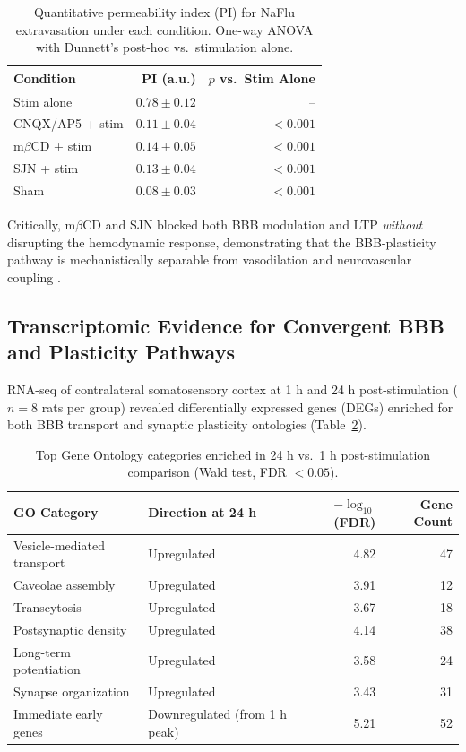 \documentclass[11pt]{article}
\begin{document}
\begin{table}[H]
\centering
\caption{Quantitative permeability index (PI) for NaFlu extravasation under each condition. One-way ANOVA with Dunnett's post-hoc vs.\ stimulation alone.}
\label{tab:pi}
\begin{tabular}{lrr}
\toprule
\textbf{Condition} & \textbf{PI (a.u.)} & \textbf{$p$ vs.\ Stim Alone} \\
\midrule
Stim alone & $0.78 \pm 0.12$ & -- \\
CNQX/AP5 + stim & $0.11 \pm 0.04$ & $<0.001$ \\
m$\beta$CD + stim & $0.14 \pm 0.05$ & $<0.001$ \\
SJN + stim & $0.13 \pm 0.04$ & $<0.001$ \\
Sham & $0.08 \pm 0.03$ & $<0.001$ \\
\bottomrule
\end{tabular}
\end{table}

Critically, m$\beta$CD and SJN blocked both BBB modulation and LTP \textit{without} disrupting the hemodynamic response, demonstrating that the BBB-plasticity pathway is mechanistically separable from vasodilation and neurovascular coupling \citep{attwell2010glial, iadecola2017neurovascular}.

\subsection{Transcriptomic Evidence for Convergent BBB and Plasticity Pathways}

RNA-seq of contralateral somatosensory cortex at 1 h and 24 h post-stimulation ($n = 8$ rats per group) revealed differentially expressed genes (DEGs) enriched for both BBB transport and synaptic plasticity ontologies (Table~\ref{tab:rnaseq}).

\begin{table}[H]
\centering
\caption{Top Gene Ontology categories enriched in 24 h vs.\ 1 h post-stimulation comparison (Wald test, FDR $< 0.05$).}
\label{tab:rnaseq}
\begin{tabular}{llrr}
\toprule
\textbf{GO Category} & \textbf{Direction at 24 h} & \textbf{$-\log_{10}$(FDR)} & \textbf{Gene Count} \\
\midrule
Vesicle-mediated transport & Upregulated & 4.82 & 47 \\
Caveolae assembly & Upregulated & 3.91 & 12 \\
Transcytosis & Upregulated & 3.67 & 18 \\
Postsynaptic density & Upregulated & 4.14 & 38 \\
Long-term potentiation & Upregulated & 3.58 & 24 \\
Synapse organization & Upregulated & 3.43 & 31 \\
Immediate early genes & Downregulated (from 1 h peak) & 5.21 & 52 \\
\bottomrule
\end{tabular}
\end{table}
\end{document}
